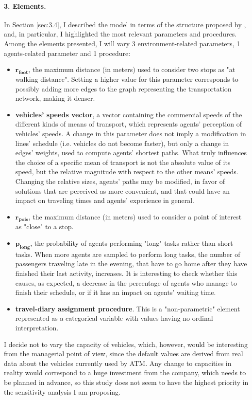 \paragraph{3. Elements.}
In Section \ref{sec:3.4}, I described the model in terms of the structure proposed by \textcite{Borgonovo2022SensitivityAO}, and, in particular, I highlighted the most relevant parameters and procedures. Among the elements presented, I will vary 3 environment-related parameters, 1 agents-related parameter and 1 procedure:
\begin{itemize}
    \item $\mathbf{r_{foot}}$, the maximum distance (in meters) used to consider two stops as "at walking distance". Setting a higher value for this parameter corresponds to possibly adding more edges to the graph representing the transportation network, making it denser.
    \item \textbf{vehicles' speeds vector}, a vector containing the commercial speeds of the different kinds of means of transport, which represents agents' perception of vehicles' speeds. A change in this parameter does not imply a modification in lines' schedule (i.e. vehicles do not become faster), but only a change in edges' weights, used to compute agents' shortest paths. What truly influences the choice of a specific mean of transport is not the absolute value of its speed, but the relative magnitude with respect to the other means' speeds. Changing the relative sizes, agents' paths may be modified, in favor of solutions that are perceived as more convenient, and that could have an impact on traveling times and agents' experience in general.
    \item $\mathbf{r_{pois}}$, the maximum distance (in meters) used to consider a point of interest as "close" to a stop. 
    \item $\mathbf{p_{long}}$, the probability of agents performing "long" tasks rather than short tasks. When more agents are sampled to perform long tasks, the number of passengers traveling late in the evening, that have to go home after they have finished their last activity, increases. It is interesting to check whether this causes, as expected, a decrease in the percentage of agents who manage to finish their schedule, or if it has an impact on agents' waiting time.
    \item \textbf{travel-diary assignment procedure}. This is a "non-parametric" element represented as a categorical variable with values having no ordinal interpretation.
\end{itemize}
I decide not to vary the capacity of vehicles, which, however, would be interesting from the managerial point of view, since the default values are derived from real data about the vehicles currently used by ATM. Any change to capacities in reality would correspond to a huge investment from the company, which needs to be planned in advance, so this study does not seem to have the highest priority in the sensitivity analysis I am proposing.


